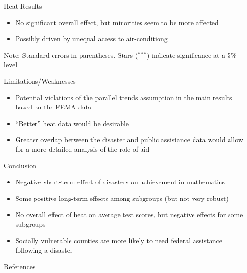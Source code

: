 \documentclass[hyperref={colorlinks = true,linkcolor = blue, citecolor=blue,urlcolor=blue}]{beamer}
\begin{document}
\begin{frame}{Heat Results}
	\begin{itemize}
		\item No significant overall effect, but minorities seem to be more affected
		\item Possibly driven by unequal access to air-conditiong \citep{Goodman_2020}
	\end{itemize}
	\tiny
	\begin{table}
		\caption{Estimated coefficients for heat models}
		\label{HeatResults}
		
		{\raggedright Note: Standard errors in parentheses. Stars ($^{***}$) indicate significance at a 5\% level \par}
	\end{table}
\end{frame}

\begin{frame}{Limitations/Weaknesses}
	\begin{itemize}
		\item Potential violations of the parallel trends assumption in the main results based on the FEMA data
		\item ``Better'' heat data would be desirable
		\item Greater overlap between the disaster and public assistance data would allow for a more detailed analysis of the role of aid
	\end{itemize}
\end{frame}

\begin{frame}{Conclusion}
	\begin{itemize}
		\item Negative short-term effect of disasters on achievement in mathematics
		\item Some positive long-term effects among subgroups (but not very robust)
		\item No overall effect of heat on average test scores, but negative effects for some subgroups
		\item Socially vulnerable counties are more likely to need federal assistance following a disaster
	\end{itemize}
\end{frame}



\begin{frame}{References}
	
	
\end{frame}
\end{document}
